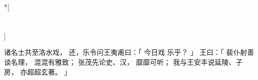 
\switchcolumn[0]*[\section{}]

诸名士共至洛水戏，
还，乐令问王夷甫曰：「
    今日戏
    乐乎？
」
王曰：「
    裴仆射善谈名理，
    混混有雅致；
    张茂先论史、汉，
    靡靡可听；
    我与王安丰说延陵、子房，
    亦超超玄著。
」

\switchcolumn


